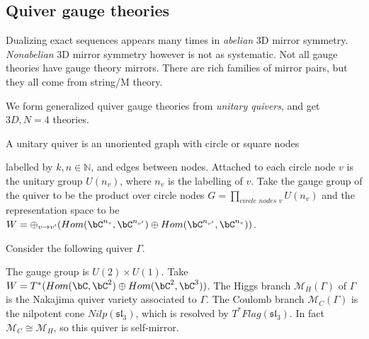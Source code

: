 
\subsection{Quiver gauge theories}

Dualizing exact sequences appears many times in \textit{abelian} 3D mirror symmetry. \textit{Nonabelian} 3D mirror symmetry however is not as systematic. Not all gauge theories have gauge theory mirrors. There are rich families of mirror pairs, but they all come from string/M theory. 

We form generalized quiver gauge theories from \textit{unitary quivers}, and get $3D, N=4$ theories. 

\begin{definition}
A unitary quiver is an unoriented graph with circle or square nodes 
labelled by $k,n \in \mathbb{N}$, and edges between nodes. Attached to each circle node $v$ is the unitary group $U(n_v)$, where $n_v$ is the labelling of $v.$ Take the gauge group of the quiver to be the product over circle nodes $G = \prod_{\textit{circle nodes }v} U(n_v)$ and the representation space to be $W = \oplus_{v \rightarrow v'} (Hom(\bC^{n_v}, \bC^{n_{v'}}) \oplus Hom(\bC^{n_{v'}}, \bC^{n_v}))$.
\end{definition}

\begin{example}
Consider the following quiver $\Gamma.$
The gauge group is $U(2) \times U(1).$ Take $W = T^*(Hom(\bC, \bC^2) \oplus Hom(\bC^2, \bC^3))$. The Higgs branch $\mathcal{M}_H(\Gamma)$ of $\Gamma$ is the Nakajima quiver variety associated to $\Gamma.$ The Coulomb branch $\mathcal{M}_C(\Gamma)$ is the nilpotent cone $Nilp(\mathfrak{sl}_3)$, which is resolved by $T^* Flag(\mathfrak{sl}_3)$. In fact $\mathcal{M}_C \cong \mathcal{M}_H$, so this quiver is self-mirror.
\end{example}


